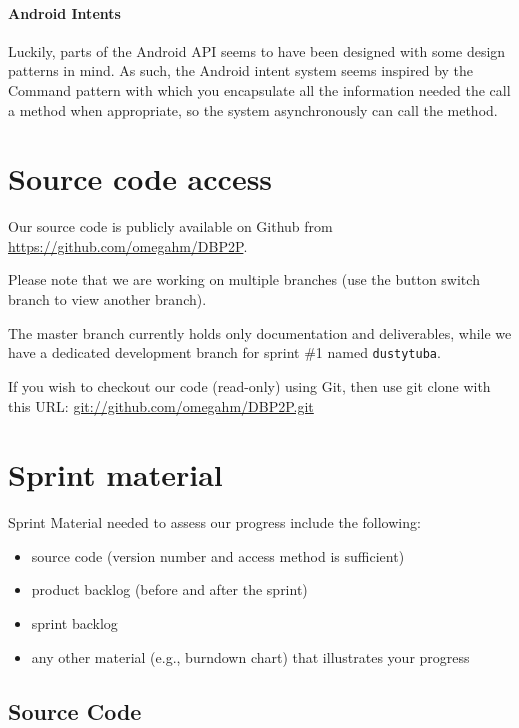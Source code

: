 \documentclass[a4paper,11pt]{article}
\begin{document}
\paragraph{Android Intents}
Luckily, parts of the Android API seems to have been designed with some design patterns in mind. As such, the Android intent system seems inspired by the Command\cite{GangOfFour} pattern with which you encapsulate all the information needed the call a method when appropriate, so the system asynchronously can call the method.

\section{Source code access}
Our source code is publicly available on Github from \url{https://github.com/omegahm/DBP2P}.

Please note that we are working on multiple branches (use the button switch branch to view another branch).

The master branch currently holds only documentation and deliverables, while we have a dedicated development branch for sprint \#1 named \texttt{dustytuba}.

If you wish to checkout our code (read-only) using Git, then use git clone with this URL:
\url{git://github.com/omegahm/DBP2P.git}


\section{Sprint material}
Sprint Material needed to assess our progress include the following:
\begin{itemize}
\item source code (version number and access method is sufficient)
\item product backlog (before and after the sprint)
\item sprint backlog
\item any other material (e.g., burndown chart) that illustrates your progress
\end{itemize}


\subsection{Source Code}

\end{document}
